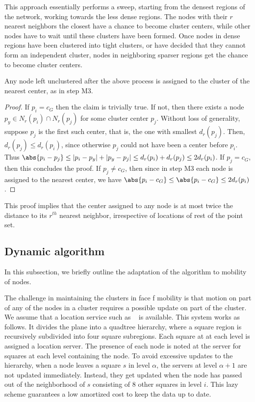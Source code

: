 This approach essentially performs a sweep, starting from the densest regions of the network, working towards the less dense regions. The nodes with their $r$ nearest neighbors the closest have a chance to become cluster centers, while other nodes have to wait until these clusters have been formed. Once nodes in dense regions have been clustered into tight clusters, or have decided that they cannot form an independent cluster, nodes in neighboring sparser regions get the chance to become cluster centers. 

Any node left unclustered after the above process is assigned to the cluster of the nearest center, as in step M3. 

\begin{theorem}
If node $p_i$ belongs to cluster $G$ with center $c_G$, then $|p_{i} - c_G}\leq 2 d_{r}(p_{i})$. 
\end{theorem}
\begin{proof}
If $p_i=c_G$ then the claim is trivially true. If not, then there exists a node $p_y \in N_{r}(p_i)\cap N_{r}(p_j)$ for some cluster center $p_j$. Without loss of generality, suppose $p_j$ is the first such center, that is, the one with smallest $d_{r}(p_j)$. Then, $d_{r}(p_j)\leq d_{r}(p_i)$, since otherwise $p_j$ could not have been a center before $p_i$. Thus $\abs{p_{i}-p_{j}}\leq |p_i-p_y|+|p_y-p_j|\leq d_r(p_i)+d_r(p_j)\leq 2 d_{r}(p_i)$.
If $p_j=c_G$, then this concludes the proof. If $p_j\neq c_G$, then since in step M3 each node is assigned to the nearest center, we have $\abs{p_{i}-c_G}\leq \abs{p_{i}-c_G}\leq 2 d_{r}(p_i)$.
\end{proof}

This proof implies that the center assigned to any node is at most twice the distance to its $r^{th}$ nearest neighbor, irrespective of locations of rest of the point set. 

\subsection{Dynamic algorithm}\label{subsec:dynamic}

In this subsection, we briefly outline the adaptation of the algorithm to mobility of nodes.

 The challenge in maintaining the clusters in face f mobility is that motion on part of any of the nodes in a cluster requires a possible update on part of the cluster. We assume that a location service such as ~\cite{abraham04LLS} is available. This system works as follows. It divides the plane into a quadtree hierarchy, where a square region is recursively subdivided into four square subregions. Each square at at each level is assigned a location server. The presence of each node is noted at the server for squares at each level containing the node. To avoid excessive updates to the hierarchy, when a node leaves a square $s$ in level $\alpha$, the servers at level $\alpha+1$ are not updated immediately. Instead, they get updated when the node has passed out of the neighborhood of $s$ consisting of $8$ other squares in level $i$. This lazy scheme guarantees a low amortized cost to keep the data up to date. 

